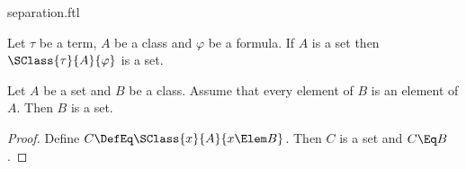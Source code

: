\documentclass{stex}
\begin{document}
\begin{smodule}{separation.ftl}


\begin{fakeforthel}
  \begin{axiom}
    Let $\tau$ be a term, $A$ be a class and $\varphi$ be a formula.
    If $A$ is a set then $\SClass{\tau}{A}{\varphi}$ is a set.
  \end{axiom}
\end{fakeforthel}

\begin{forthel}
  \begin{corollary}
    Let $A$ be a set and $B$ be a class.
    Assume that every element of $B$ is an element of $A$.
    Then $B$ is a set.
  \end{corollary}
  \begin{proof}
    Define $C \DefEq \SClass{x}{A}{x \Elem B}$.
    Then $C$ is a set and $C \Eq B$.
  \end{proof}
\end{forthel}

\end{smodule}
\end{document}
